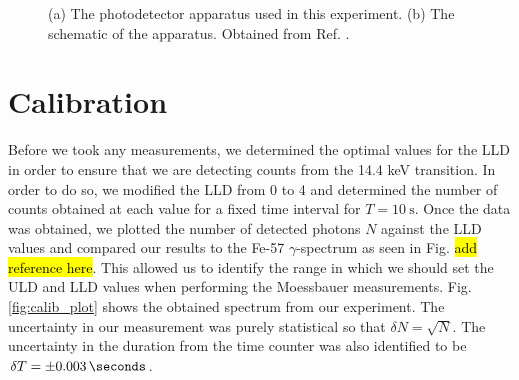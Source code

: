 \documentclass[a4paper]{report}
\numberwithin{equation}{section}
\begin{document}
\begin{figure}[htb!]
	\centering
	\quad
	\centering
	\caption{(a) The photodetector apparatus used in this experiment. (b) The schematic of the apparatus. Obtained from 
			Ref. \cite{k2212016}.}
	\label{fig:apparatus_raw}
\end{figure}


\chapter{Calibration} \label{sec:calibration}

Before we took any measurements, we determined the optimal values for the LLD in order to ensure that we are 
detecting counts from the 14.4 keV transition. In order to do so, we modified the LLD from 0 to 4 and determined the number 
of counts obtained at each value for a fixed time interval for $T = \SI{10}{\second}$. Once the data was obtained, 
we plotted the number of detected photons $N$ against the LLD values and compared our results to the Fe-57 $\gamma$-spectrum as seen in Fig. \hl{add reference here}.
This allowed us to identify the range in which we should set the ULD and LLD values when performing the Moessbauer measurements. 
 Fig. \ref{fig:calib_plot} shows the obtained spectrum from our experiment. The uncertainty in our measurement was purely statistical so
 that $\delta N = \sqrt{N}$. The uncertainty in the duration from the time counter was also identified to be $\delta T = \pm \SI{0.003}{\seconds}$.
\end{document}
